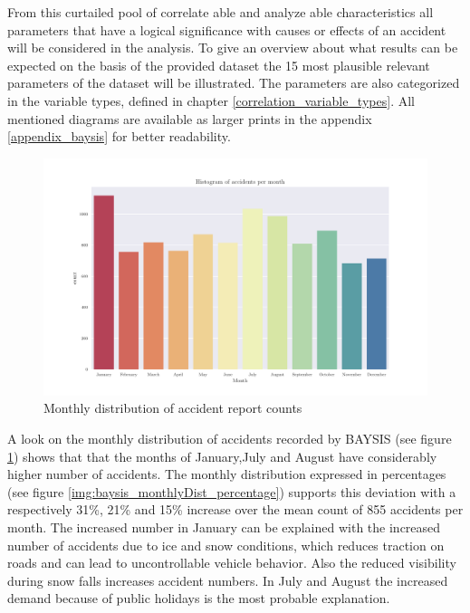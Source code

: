 \documentclass[a4paper,12pt]{report}
\begin{document}
From this curtailed pool of correlate able and analyze able characteristics all parameters that have a logical significance with causes or effects of an accident will be considered in the analysis. To give an overview about what results can be expected on the basis of the provided dataset the 15 most plausible relevant parameters of the dataset will be illustrated. The parameters are also categorized in the variable types, defined in chapter \ref{correlation_variable_types}. All mentioned diagrams are available as larger prints in the appendix \ref{appendix_baysis} for better readability. 

\begin{figure}[H]
	\centering
	\includegraphics[scale=0.5]{../CorrAnalysis/data/BAYSIS/01_dataset/plots/baysis_dataset_hist_month}
	\caption{Monthly distribution of accident report counts}
	\label{img:baysis_monthlyDist_absolute}
\end{figure}


A look on the monthly distribution of accidents recorded by BAYSIS (see figure \ref{img:baysis_monthlyDist_absolute}) shows that that the months of January,July and August have considerably higher number of accidents. The monthly distribution expressed in percentages (see figure \ref{img:baysis_monthlyDist_percentage}) supports this deviation with a respectively 31\%, 21\% and 15\% increase over the mean count of 855 accidents per month. The increased number in January can be explained with the increased number of accidents due to ice and snow conditions, which reduces traction on roads and can lead to uncontrollable vehicle behavior. Also the reduced visibility during snow falls increases accident numbers. In July and August the increased demand because of public holidays is the most probable explanation.
\end{document}
